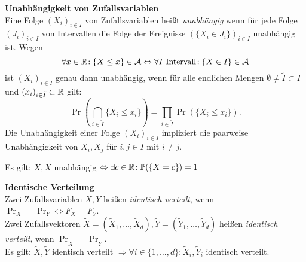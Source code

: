 \newpage
\textbf{Unabhängigkeit von Zufallsvariablen}\\
Eine Folge $(X_i)_{i \in I}$ von Zufallsvariablen heißt \textit{unabhängig} wenn
für jede Folge $(J_i)_{i \in I}$ von Intervallen die Folge der Ereignisse
$(\{X_i \in J_i\})_{i \in I}$ unabhängig ist.
Wegen
\[
  \forall x\in\mathbb{R}\!: \{X \leq x\} \in \mathcal{A}
  \Leftrightarrow \forall I \text{ Intervall}\!: \{X \in I\} \in \mathcal{A}
\]
ist $(X_i)_{i \in I}$ genau dann unabhängig, wenn für alle endlichen Mengen
$\emptyset \neq \tilde{I} \subset I$ und
\mbox{$(x_i)_{i\in\tilde{I}}\subset\mathbb{R}$} gilt:
\[
  \Pr\left(\bigcap_{i\in\tilde{I}} \{X_i \leq x_i\}\right)=
  \prod_{i\in\tilde{I}} \Pr(\{X_i \leq x_i\}).
\]
Die Unabhängigkeit einer Folge $(X_i)_{i \in I}$ impliziert die paarweise
Unabhängigkeit von $X_i,X_j$ für $i,j \in I$ mit $i \neq j$.

Es gilt: $X,X$ unabhängig $\Leftrightarrow \exists c\in\mathbb{R}\!: \mathbb{P}(\{X=c\}) = 1$

\textbf{Identische Verteilung}\\
Zwei Zufallsvariablen $X,Y$ heißen \textit{identisch verteilt},
wenn $\Pr_X = \Pr_Y \Leftrightarrow F_X = F_Y$.\\
Zwei Zufallsvektoren
$\tilde{X} = (\tilde{X}_1,\ldots,\tilde{X}_d),
\tilde{Y} = (\tilde{Y}_1,\ldots,\tilde{Y}_d)$
heißen \textit{identisch verteilt}, wenn
$\Pr_{\tilde{X}} = \Pr_{\tilde{Y}}$.\\
Es gilt: $\tilde{X},\tilde{Y}$ identisch verteilt
$\Rightarrow \forall i\in\{1,\ldots,d\}\!: \tilde{X}_i,\tilde{Y}_i$ identisch verteilt.

